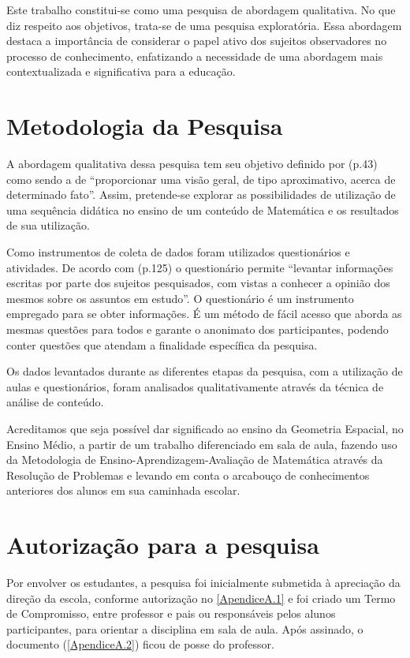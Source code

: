 Este trabalho constitui-se como uma pesquisa de abordagem qualitativa. No que diz respeito aos objetivos, trata-se de uma pesquisa exploratória. Essa abordagem destaca a importância de considerar o papel ativo dos sujeitos observadores no processo de conhecimento, enfatizando a necessidade de uma abordagem mais contextualizada e significativa para a educação.

\section{Metodologia da Pesquisa}

A abordagem qualitativa dessa pesquisa tem seu objetivo definido por  (p.43) como sendo a de ``proporcionar uma visão geral, de tipo aproximativo, acerca de determinado fato''. Assim, pretende-se explorar as possibilidades de utilização de uma sequência didática no ensino de um conteúdo de Matemática e os resultados de sua utilização.

Como instrumentos de coleta de dados foram utilizados questionários e atividades. De acordo com  (p.125) o questionário permite ``levantar informações escritas por parte dos sujeitos pesquisados, com vistas a conhecer a opinião dos mesmos sobre os assuntos em estudo''. O questionário é um instrumento empregado para se obter informações. É um método de fácil acesso que aborda as mesmas questões para todos e garante o anonimato dos participantes, podendo conter questões que atendam a finalidade específica da pesquisa.

Os dados levantados durante as diferentes etapas da pesquisa, com a utilização de aulas e questionários, foram analisados qualitativamente através da técnica de análise de conteúdo.

Acreditamos que seja possível dar significado ao ensino da Geometria Espacial, no Ensino Médio, a partir de um trabalho diferenciado em sala de aula, fazendo uso da Metodologia de Ensino-Aprendizagem-Avaliação de Matemática através da Resolução de Problemas e levando em conta o arcabouço de  conhecimentos anteriores dos alunos em sua caminhada escolar.

\section{Autorização para a pesquisa}

Por envolver os estudantes, a pesquisa foi inicialmente submetida à apreciação da direção da escola, conforme autorização no \autoref{ApendiceA.1} e foi criado um Termo de Compromisso, entre professor e pais ou responsáveis pelos alunos participantes, para orientar a disciplina em sala de aula. Após assinado, o documento (\autoref{ApendiceA.2}) ficou de posse do professor.

